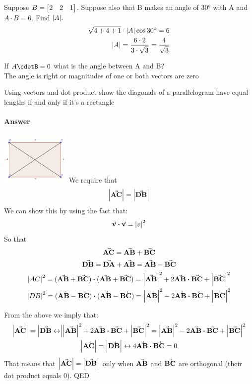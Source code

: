 \documentclass{article}
\begin{document}
    \begin{problem}
        Suppose $B=\bmqty{2 & 2 & 1}$. Suppose also that B makes an angle of $\ang{30}$ with A and $A\cdot B=6$. Find $\abs{A}.$\\
        \begin{align}
            \sqrt{4 + 4 +1}\cdot\abs{A}\cos{\ang{30}}=6\\
            \abs{A}=\frac{6\cdot2}{3\cdot\sqrt{3}}=\frac{4}{\sqrt{3}}
        \end{align}
    \end{problem}

    \begin{problem}
        If $A\cdotB=0$ what is the angle between A and B?\\
        The angle is right or magnitudes of one or both vectors are zero
    \end{problem}

    \begin{problem}
        Using vectors and dot product show the diagonals of a parallelogram have equal lengths if and only if it's a rectangle
        \paragraph{Answer}
        \includegraphics[width=0.25\textwidth]{fig_1.png}
        We require that
        \[\abs{\va{AC}}=\abs{\va{DB}}\]
        We can show this by using the fact that:
        \[\va{v}\vdot\va{v}=\abs{v}^2\]
        So that
        \begin{gather}
            \va{AC}=\va{AB}+\va{BC}\\
            \va{DB}=\va{DA}+\va{AB}=\va{AB}-\va{BC}\\
            \abs{AC}^2=(\va{AB}+\va{BC})\vdot(\va{AB}+\va{BC})
            =\abs{\va{AB}}^2+2\va{AB}\vdot\va{BC}+\abs{\va{BC}}^{2}\\
            \abs{DB}^2=(\va{AB}-\va{BC})\vdot(\va{AB}-\va{BC})
            =\abs{\va{AB}}^2-2\va{AB}\vdot\va{BC}+\abs{\va{BC}}^2
        \end{gather}

        From the above we imply that:
        \begin{gather}
            \abs{\va{AC}}=\abs{\va{DB}\leftrightarrow}
            \abs{\va{AB}}^2+2\va{AB}\vdot\va{BC}+\abs{\va{BC}}^{2}=
            \abs{\va{AB}}^2-2\va{AB}\vdot\va{BC}+\abs{\va{BC}}^{2}\\
            \abs{\va{AC}}=\abs{\va{DB}}\leftrightarrow
            4\va{AB}\vdot\va{BC}=0
        \end{gather}
        That means that $\abs{\va{AC}}=\abs{\va{DB}}$ only when $\va{AB}$ and $\va{BC}$ are orthogonal (their dot product equals 0). QED

    \end{problem}
\end{document}

